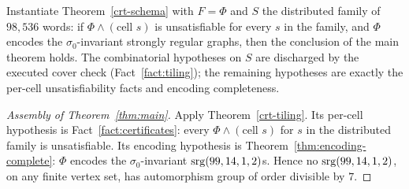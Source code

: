 \begin{theorem}\label{crt-tiling}
Instantiate Theorem~\ref{crt-schema} with $F = \Phi$ and $S$ the
distributed family of $98{,}536$ words: if $\Phi \wedge (\text{cell } s)$
is unsatisfiable for every $s$ in the family, and $\Phi$ encodes the
$\sigma_0$-invariant strongly regular graphs, then the conclusion of the
main theorem holds.  The combinatorial hypotheses on $S$ are discharged by
the executed cover check (Fact~\ref{fact:tiling}); the remaining hypotheses
are exactly the per-cell unsatisfiability facts and encoding completeness.
\leanok
{}
\end{theorem}

\begin{proof}[Assembly of Theorem~\ref{thm:main}]
Apply Theorem~\ref{crt-tiling}.  Its per-cell hypothesis is
Fact~\ref{fact:certificates}: every $\Phi \wedge (\text{cell } s)$ for $s$
in the distributed family is unsatisfiable.  Its encoding hypothesis is
Theorem~\ref{thm:encoding-complete}: $\Phi$ encodes the
$\sigma_0$-invariant $\mathrm{srg}(99,14,1,2)$s.  Hence no $\mathrm{srg}(99,14,1,2)$, on
any finite vertex set, has automorphism group of order divisible by $7$.
\end{proof}


